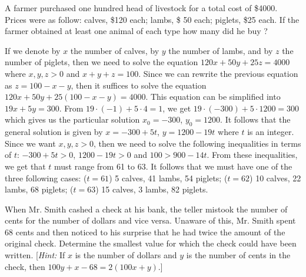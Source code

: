 \begin{exercise}
    A farmer purchased one hundred head of livestock for a total cost of \$4000. Prices were as follow: calves, \$120 each; lambs, \$ 50 each; piglets, \$25 each. If the farmer obtained at least one animal of each type how many did he buy ?\\
\end{exercise}

\begin{solution}
    If we denote by $x$ the number of calves, by $y$ the number of lambs, and by $z$ the number of piglets, then we need to solve the equation $120x + 50y + 25z = 4000$ where $x,y,z > 0$ and $x + y + z = 100$. Since we can rewrite the previous equation as $z = 100 - x - y$, then it suffices to solve the equation $120x + 50y + 25(100 - x - y) = 4000$. This equation can be simplified into $19x + 5y = 300$. From $19 \cdot (-1) + 5 \cdot 4 = 1$, we get $19 \cdot (-300) + 5 \cdot 1200 = 300$ which gives us the particular solution $x_0 = -300$, $y_0 = 1200$. It follows that the general solution is given by $x = -300 + 5t$, $y = 1200 - 19t$ where $t$ is an integer. Since we want $x,y,z > 0$, then we need to solve the following inequalities in terms of $t$: $-300 + 5t > 0$, $1200 - 19t > 0$ and $100 > 900 - 14t$. From these inequalities, we get that $t$ must range from 61 to 63. It follows that we must have one of the three following cases: ($t = 61$) 5 calves, 41 lambs, 54 piglets; ($t = 62$) 10 calves, 22 lambs, 68 piglets; ($t = 63$) 15 calves, 3 lambs, 82 piglets. \\
\end{solution}

\begin{exercise}
    When Mr. Smith cashed a check at his bank, the teller mistook the number of cents for the number of dollars and vice versa. Unaware of this, Mr. Smith spent 68 cents and then noticed to his surprise that he had twice the amount of the original check. Determine the smallest value for which the check could have been written. [\textit{Hint:} If $x$ is the number of dollars and $y$ is the number of cents in the check, then $100y + x - 68 = 2(100x + y)$.]\\
\end{exercise}

